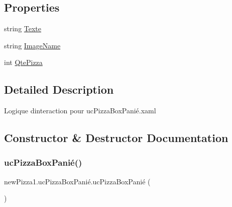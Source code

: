 \subsection*{Properties}
\begin{DoxyCompactItemize}
\item 
string \hyperlink{classnewPizza1_1_1ucPizzaBoxPani_xC3_xA9_af728257fb50af6245121a9f674d235e4}{Texte}
\item 
string \hyperlink{classnewPizza1_1_1ucPizzaBoxPani_xC3_xA9_a817d69a2bc6b5ec60c1237452d8c1814}{Image\+Name}
\item 
int \hyperlink{classnewPizza1_1_1ucPizzaBoxPani_xC3_xA9_a25cbbaba5b410a7381cdd27f51295422}{Qte\+Pizza}
\end{DoxyCompactItemize}


\subsection{Detailed Description}
Logique d\textquotesingle{}interaction pour uc\+Pizza\+Box\+Panié.\+xaml 



\subsection{Constructor \& Destructor Documentation}
\mbox{\label{classnewPizza1_1_1ucPizzaBoxPani_xC3_xA9_a56d476316603c46b5fbb8e6fbb358341}} 
\subsubsection{\texorpdfstring{uc\+Pizza\+Box\+Panié()}{ucPizzaBoxPanié()}}
{\footnotesize\ttfamily new\+Pizza1.\+uc\+Pizza\+Box\+Panié.\+uc\+Pizza\+Box\+Panié (\begin{DoxyParamCaption}{ }\end{DoxyParamCaption})\hspace{0.3cm}{\ttfamily [inline]}}


